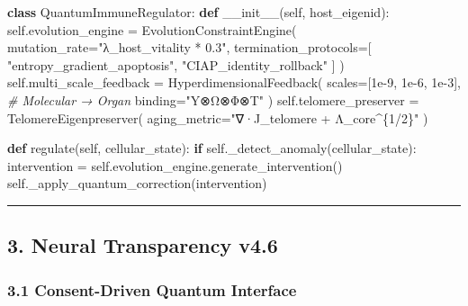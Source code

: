 \documentclass[
]{article}
\newenvironment{Shaded}{}{}
\newcommand{\CommentTok}[1]{\textcolor[rgb]{0.38,0.63,0.69}{\textit{#1}}}
\newcommand{\ControlFlowTok}[1]{\textcolor[rgb]{0.00,0.44,0.13}{\textbf{#1}}}
\newcommand{\FloatTok}[1]{\textcolor[rgb]{0.25,0.63,0.44}{#1}}
\newcommand{\FunctionTok}[1]{\textcolor[rgb]{0.02,0.16,0.49}{#1}}
\newcommand{\KeywordTok}[1]{\textcolor[rgb]{0.00,0.44,0.13}{\textbf{#1}}}
\newcommand{\NormalTok}[1]{#1}
\newcommand{\OperatorTok}[1]{\textcolor[rgb]{0.40,0.40,0.40}{#1}}
\newcommand{\StringTok}[1]{\textcolor[rgb]{0.25,0.44,0.63}{#1}}
\newcommand{\VariableTok}[1]{\textcolor[rgb]{0.10,0.09,0.49}{#1}}
\begin{document}
\begin{Shaded}
\begin{Highlighting}[]
\KeywordTok{class}\NormalTok{ QuantumImmuneRegulator:}
    \KeywordTok{def} \FunctionTok{\_\_init\_\_}\NormalTok{(}\VariableTok{self}\NormalTok{, host\_eigenid):}
        \VariableTok{self}\NormalTok{.evolution\_engine }\OperatorTok{=}\NormalTok{ EvolutionConstraintEngine(}
\NormalTok{            mutation\_rate}\OperatorTok{=}\StringTok{"λ\_host\_vitality * 0.3"}\NormalTok{,}
\NormalTok{            termination\_protocols}\OperatorTok{=}\NormalTok{[}
                \StringTok{"entropy\_gradient\_apoptosis"}\NormalTok{,}
                \StringTok{"CIAP\_identity\_rollback"}
\NormalTok{            ]}
\NormalTok{        )}
        \VariableTok{self}\NormalTok{.multi\_scale\_feedback }\OperatorTok{=}\NormalTok{ HyperdimensionalFeedback(}
\NormalTok{            scales}\OperatorTok{=}\NormalTok{[}\FloatTok{1e{-}9}\NormalTok{, }\FloatTok{1e{-}6}\NormalTok{, }\FloatTok{1e{-}3}\NormalTok{],  }\CommentTok{\# Molecular → Organ}
\NormalTok{            binding}\OperatorTok{=}\StringTok{"Y⊗Ω⊗Φ⊗T"}
\NormalTok{        )}
        \VariableTok{self}\NormalTok{.telomere\_preserver }\OperatorTok{=}\NormalTok{ TelomereEigenpreserver(}
\NormalTok{            aging\_metric}\OperatorTok{=}\StringTok{"∇·J\_telomere + Λ\_core\^{}\{1/2\}"}
\NormalTok{        )}

    \KeywordTok{def}\NormalTok{ regulate(}\VariableTok{self}\NormalTok{, cellular\_state):}
        \ControlFlowTok{if} \VariableTok{self}\NormalTok{.\_detect\_anomaly(cellular\_state):}
\NormalTok{            intervention }\OperatorTok{=} \VariableTok{self}\NormalTok{.evolution\_engine.generate\_intervention()}
            \VariableTok{self}\NormalTok{.\_apply\_quantum\_correction(intervention)}
\end{Highlighting}
\end{Shaded}

\begin{center}\rule{0.5\linewidth}{0.5pt}\end{center}

\subsection{\texorpdfstring{\textbf{3. Neural Transparency
v4.6}}{3. Neural Transparency v4.6}}\label{neural-transparency-v4.6}

\subsubsection{\texorpdfstring{\textbf{3.1 Consent-Driven Quantum
Interface}}{3.1 Consent-Driven Quantum Interface}}\label{consent-driven-quantum-interface}
\end{document}
